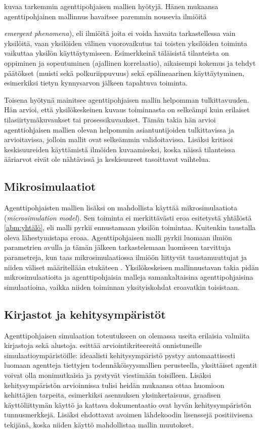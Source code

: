 \documentclass[finnish,gradu,twoside,12pt]{tktltiki}
\begin{document}
\citet{Bonabeau2002} kuvaa tarkemmin agenttipohjaisen mallien hyötyjä. Hänen mukaansa agenttipohjainen mallinnus havaitsee paremmin nousevia ilmiöitä {\textit{emergent phenomena}), eli ilmiöitä joita ei voida havaita tarkastellessa vain yksilöitä, vaan yksilöiden välinen vuorovaikutus tai toisten yksilöiden toiminta vaikuttaa yksilön käyttäytymiseen. Esimerkkeinä täläisistä tilanteista on oppiminen ja sopeutuminen (ajallinen korrelaatio), aikaisempi kokemus ja tehdyt päätökset (muisti sekä polkuriippuvuus) sekä epälineaarinen käyttäytyminen, esimerkiksi tietyn kynnysarvon jälkeen tapahtuva toiminta.

Toisena hyötynä \citet{Bonabeau2002} mainitsee agenttipohjaisen mallin helpomman tulkittavuuden. Hän arvioi, että yksilökeskeinen kuvaus toiminnasta on selkeämpi kuin erilaiset tilasiirtymäkuvaukset tai prosessikuvaukset. Tämän takia hän arvioi agenttiohjaisen mallien olevan helpommin asiantuntijoiden tulkittavissa ja arvioitavissa, jolloin mallit ovat selkeämmin validoitavissa. Lisäksi \citet{Bonabeau2002} kritisoi keskisuureiden käyttämistä ilmöiden kuvaamiseksi, koska näissä tilanteissa ääriarvot eivät ole nähtävissä ja keskisuureet tasoittavat vaihtelua.

\subsection*{Mikrosimulaatiot}

Agenttipohjaisten mallien lisäksi on mahdollista käyttää mikrosimulaatiota  (\textit{microsimulation model}). Sen toiminta ei merkittävästi eroa esitetystä yhtälöstä \ref{abm:yhtälö}, eli malli pyrkii ennustamaan yksilön toimintaa. Kuitenkin taustalla oleva lähestymistapa eroaa. Agenttipohjaisen malli pyrkii luomaan ilmiön parametrien avulla ja tämän jälkeen tarkastelemaan luomiseen tarvittuja parametreja, kun taas mikrosimulaatiossa ilmiöön liittyvät taustamuuttujat ja niiden väliset määritellään etukäteen \citep[58--59]{Gilbert2005}. Yksilökeskeisen mallinnustavan takia pidän mikrosimulaatioita ja agenttipohjaisia malleja samankaltaisina agenttipohjaisina simulaatioina, vaikka niiden toiminnan yksityiskohdat eroavatkin toisistaan.

\subsection*{Kirjastot ja kehitysympäristöt}

Agenttipohjaisen simulaation toteutukseen on olemassa useita erilaisia valmiita kirjastoja sekä alustoja. \cite{Tobias2004} esittää arviointikriteereitä onnistuneille simulaatioympäristöille: ideaalisti kehitysympäristö pystyy automaattisesti luomaan agentteja tiettyjen todennäköisyysmallien perusteella, yksittäiset agentit voivat olla monimutkaisia ja pystyvät viestimään toisilleen. Lisäksi kehitysympäristön arvioinnissa tulisi heidän mukaansa ottaa huomioon kehittäjien tarpeita, esimerkiksi asennuksen yksinkertaisuus, graafisen käyttöliittymän käyttö ja kattava dokumentaatio ovat hyvän kehitysympäristön tunnusmerkkejä. Lisäksi \citet{Tobias2004} ehdottavat avoimen lähdekoodin lisenssejä positiivisena tekijänä, koska niiden käyttö mahdollistaa mallin muutokset.

}
\end{document}
